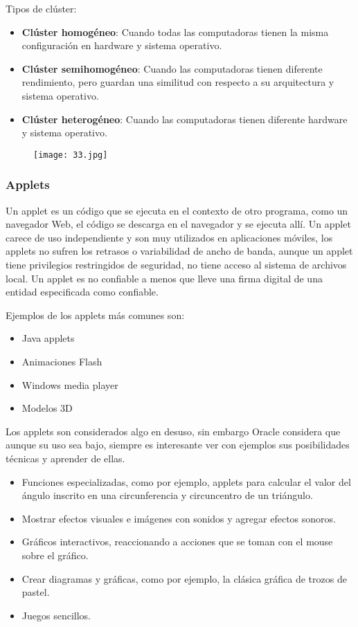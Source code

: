Tipos de clúster:

\begin{itemize}
	\item \textbf{Clúster homogéneo}: Cuando todas las computadoras tienen la misma configuración en hardware y sistema operativo.
	\item \textbf{Clúster semihomogéneo}: Cuando las computadoras tienen diferente rendimiento, pero guardan una similitud con respecto a su arquitectura y sistema operativo.
	\item \textbf{Clúster heterogéneo}: Cuando las computadoras tienen diferente hardware y sistema operativo.
\end{itemize}

\begin{figure}[h!]
		\centering
		{\texttt{[image: 33.jpg]}\par} \vspace{1cm}
\end{figure}

{\raggedright
\subsubsection{\textbf{Applets}}
}

Un applet es un código que se ejecuta en el contexto de otro programa, como un navegador Web, el código se descarga en el navegador y se ejecuta allí. Un applet carece de uso independiente y son muy utilizados en aplicaciones móviles, los applets no sufren los retrasos o variabilidad de ancho de banda, aunque un applet tiene privilegios restringidos de seguridad, no tiene acceso al sistema de archivos local. Un applet es no confiable a menos que lleve una firma digital de una entidad especificada como confiable.\hfill \break

Ejemplos de los applets más comunes son:

\begin{itemize}
	\item Java applets
	\item Animaciones Flash
	\item Windows media player
	\item Modelos 3D
\end{itemize}

Los applets son considerados algo en desuso, sin embargo Oracle considera que aunque su uso sea bajo, siempre es interesante ver con ejemplos sus posibilidades técnicas y aprender de ellas.

\begin{itemize}
	\item Funciones especializadas, como por ejemplo, applets para calcular el valor del ángulo inscrito en una circunferencia y circuncentro de un triángulo.
	\item Mostrar efectos visuales e imágenes con sonidos y agregar efectos sonoros.
	\item Gráficos interactivos, reaccionando a acciones que se toman con el mouse sobre el gráfico.
	\item Crear diagramas y gráficas, como por ejemplo, la clásica gráfica de trozos de pastel.
	\item Juegos sencillos.
\end{itemize}

